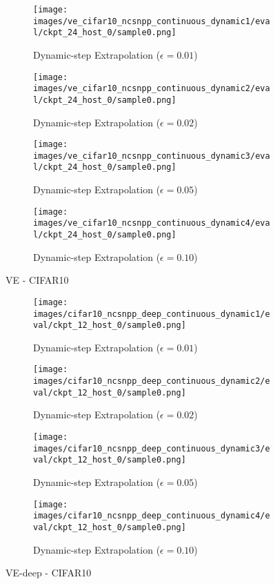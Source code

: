 \documentclass{article}
\begin{document}
\begin{figure}[ht] 
\begin{subfigure}[b]{0.5\linewidth}
    \centering
    \texttt{[image: images/ve\_cifar10\_ncsnpp\_continuous\_dynamic1/eval/ckpt\_24\_host\_0/sample0.png]} 
    \caption{Dynamic-step Extrapolation ($\epsilon=0.01$)} 
  \end{subfigure}
  \begin{subfigure}[b]{0.5\linewidth}
    \centering
    \texttt{[image: images/ve\_cifar10\_ncsnpp\_continuous\_dynamic2/eval/ckpt\_24\_host\_0/sample0.png]}
    \caption{Dynamic-step Extrapolation ($\epsilon=0.02$)} 
  \end{subfigure}
  \begin{subfigure}[b]{0.5\linewidth}
    \centering
    \texttt{[image: images/ve\_cifar10\_ncsnpp\_continuous\_dynamic3/eval/ckpt\_24\_host\_0/sample0.png]} 
    \caption{Dynamic-step Extrapolation ($\epsilon=0.05$)} 
  \end{subfigure}
  \begin{subfigure}[b]{0.5\linewidth}
    \centering
    \texttt{[image: images/ve\_cifar10\_ncsnpp\_continuous\_dynamic4/eval/ckpt\_24\_host\_0/sample0.png]}
    \caption{Dynamic-step Extrapolation ($\epsilon=0.10$)} 
  \end{subfigure}
  \caption{VE - CIFAR10}
  \label{fig13} 
\end{figure}


\begin{figure}[ht] 
  \begin{subfigure}[b]{0.5\linewidth}
    \centering
    \texttt{[image: images/cifar10\_ncsnpp\_deep\_continuous\_dynamic1/eval/ckpt\_12\_host\_0/sample0.png]} 
    \caption{Dynamic-step Extrapolation ($\epsilon=0.01$)} 
  \end{subfigure}
  \begin{subfigure}[b]{0.5\linewidth}
    \centering
    \texttt{[image: images/cifar10\_ncsnpp\_deep\_continuous\_dynamic2/eval/ckpt\_12\_host\_0/sample0.png]}
    \caption{Dynamic-step Extrapolation ($\epsilon=0.02$)} 
  \end{subfigure}
  \begin{subfigure}[b]{0.5\linewidth}
    \centering
    \texttt{[image: images/cifar10\_ncsnpp\_deep\_continuous\_dynamic3/eval/ckpt\_12\_host\_0/sample0.png]} 
    \caption{Dynamic-step Extrapolation ($\epsilon=0.05$)} 
  \end{subfigure}
  \begin{subfigure}[b]{0.5\linewidth}
    \centering
    \texttt{[image: images/cifar10\_ncsnpp\_deep\_continuous\_dynamic4/eval/ckpt\_12\_host\_0/sample0.png]}
    \caption{Dynamic-step Extrapolation ($\epsilon=0.10$)} 
  \end{subfigure}
  \caption{VE-deep - CIFAR10}
  \label{fig14} 
\end{figure}
\end{document}
